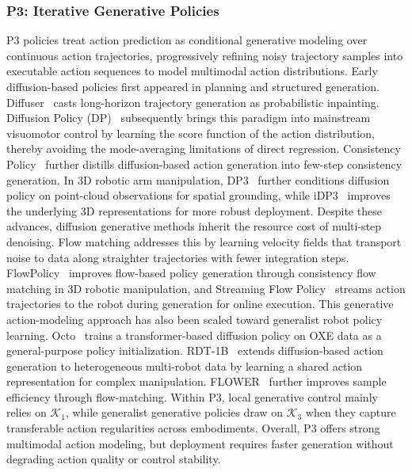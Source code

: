 \documentclass[acmsmall,screen,review]{acmart}
\begin{document}
\subsubsection{P3: Iterative Generative Policies}\label{sec:iterative_generative_policies}

P3 policies treat action prediction as conditional generative modeling over continuous action trajectories, progressively refining noisy trajectory samples into executable action sequences to model multimodal action distributions.
Early diffusion-based policies first appeared in planning and structured generation.
Diffuser~\cite{janner2022diffuser} casts long-horizon trajectory generation as probabilistic inpainting. 
Diffusion Policy (DP)~\cite{chi2023diffusion} subsequently brings this paradigm into mainstream visuomotor control by learning the score function of the action distribution, thereby avoiding the mode-averaging limitations of direct regression. 
Consistency Policy~\cite{prasad2024consistency} further distills diffusion-based action generation into few-step consistency generation.
In 3D robotic arm manipulation, DP3~\cite{ze2024diffusion} further conditions diffusion policy on point-cloud observations for spatial grounding, while iDP3~\cite{liang2024idp3} improves the underlying 3D representations for more robust deployment.
Despite these advances, diffusion generative methods inherit the resource cost of multi-step denoising.
Flow matching addresses this by learning velocity fields that transport noise to data along straighter trajectories with fewer integration steps. 
FlowPolicy~\cite{zhang2025flowpolicy} improves flow-based policy generation through consistency flow matching in 3D robotic manipulation, 
and Streaming Flow Policy~\cite{jiang2025streaming} streams action trajectories to the robot during generation for online execution.
This generative action-modeling approach has also been scaled toward generalist robot policy learning.
Octo~\cite{octomodelteam2024} trains a transformer-based diffusion policy on OXE data as a general-purpose policy initialization.
RDT-1B~\cite{liu2025rdtb} extends diffusion-based action generation to heterogeneous multi-robot data by learning a shared action representation for complex manipulation.
FLOWER~\cite{reuss2025flower} further improves sample efficiency through flow-matching.
Within P3, local generative control mainly relies on \(\mathcal{K}_1\), while generalist generative policies draw on \(\mathcal{K}_3\) when they capture transferable action regularities across embodiments.
Overall, P3 offers strong multimodal action modeling, but deployment requires faster generation without degrading action quality or control stability.
\end{document}
